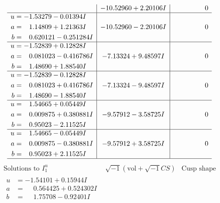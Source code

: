 \documentclass[1p]{elsarticle_modified}
\theoremstyle{definition}
\newcommand{\I}{\sqrt{-1}}
\begin{document}
$$\begin{array}{c|c|c}
 & -10.52960 + 2.20106 I & \phantom{-0.000000 } 0 \\ \hline\begin{aligned}
u &= -1.53279 - 0.01394 I \\
a &= \phantom{-}1.14809 + 1.21363 I \\
b &= \phantom{-}0.620121 - 0.251284 I\end{aligned}
 & -10.52960 - 2.20106 I & \phantom{-0.000000 } 0 \\ \hline\begin{aligned}
u &= -1.52839 + 0.12828 I \\
a &= \phantom{-}0.081023 - 0.416786 I \\
b &= \phantom{-}1.48690 + 1.88540 I\end{aligned}
 & -7.13324 + 9.48597 I & \phantom{-0.000000 } 0 \\ \hline\begin{aligned}
u &= -1.52839 - 0.12828 I \\
a &= \phantom{-}0.081023 + 0.416786 I \\
b &= \phantom{-}1.48690 - 1.88540 I\end{aligned}
 & -7.13324 - 9.48597 I & \phantom{-0.000000 } 0 \\ \hline\begin{aligned}
u &= \phantom{-}1.54665 + 0.05449 I \\
a &= \phantom{-}0.009875 + 0.380881 I \\
b &= \phantom{-}0.95023 - 2.11525 I\end{aligned}
 & -9.57912 - 3.58725 I & \phantom{-0.000000 } 0 \\ \hline\begin{aligned}
u &= \phantom{-}1.54665 - 0.05449 I \\
a &= \phantom{-}0.009875 - 0.380881 I \\
b &= \phantom{-}0.95023 + 2.11525 I\end{aligned}
 & -9.57912 + 3.58725 I & \phantom{-0.000000 } 0\\
 \hline 
 \end{array}$$\newpage$$\begin{array}{c|c|c}  
\text{Solutions to }I^u_{1}& \I (\text{vol} + \sqrt{-1}CS) & \text{Cusp shape}\\
 \hline 
\begin{aligned}
u &= -1.54101 + 0.15944 I \\
a &= \phantom{-}0.564425 + 0.524302 I \\
b &= \phantom{-}1.75708 - 0.92401 I\end{aligned}

\end{array}$$
\end{document}

